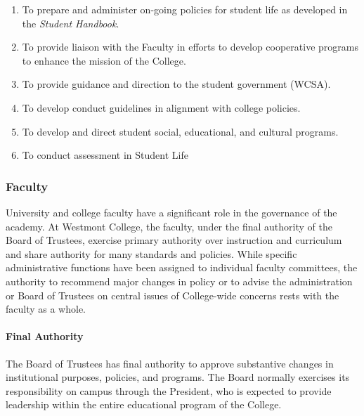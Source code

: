 \documentclass[letterpaper, 11pt]{article}
\begin{document}
\begin{enumerate}
{\begin{enumerate}
{\begin{enumerate}
										\item{To prepare and administer on-going policies for student life as developed in the \emph{Student Handbook}.}
										\item{To provide liaison with the Faculty in efforts to develop cooperative programs to enhance the mission of the College.}
										\item{To provide guidance and direction to the student government (WCSA).}
										\item{To develop conduct guidelines in alignment with college policies.}
										\item{To develop and direct student social, educational, and cultural programs.}
										\item{To conduct assessment in Student Life}
									\end{enumerate}
								}
							\end{enumerate}
						}
					\end{enumerate}

		\subsubsection{Faculty}

			University and college faculty have a significant role in the
			governance of the academy. At Westmont College, the faculty, under
			the final authority of the Board of Trustees, exercise primary
			authority over instruction and curriculum and share authority for
			many standards and policies.  While specific administrative
			functions have been assigned to individual faculty committees, the
			authority to recommend major changes in policy or to advise the
			administration or Board of Trustees on central issues of
			College-wide concerns rests with the faculty as a whole.

			\paragraph{Final Authority}

				The Board of Trustees has final authority to approve substantive changes in institutional purposes, policies, and programs.  The Board normally exercises its responsibility on campus through the President, who is expected to provide leadership within the entire educational program of the College.
\end{document}
